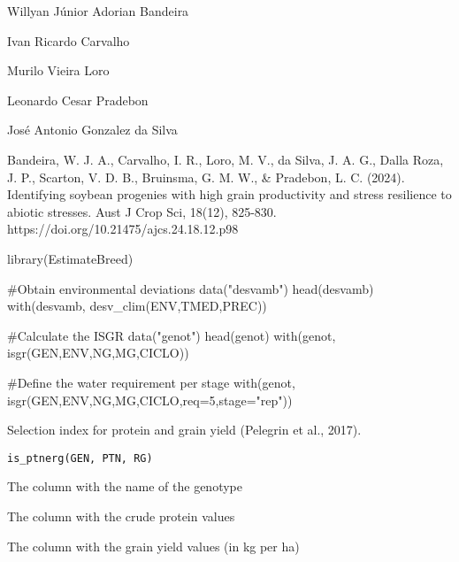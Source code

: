 \documentclass[a4paper]{book}
\begin{document}
%
\begin{Author}
Willyan Júnior Adorian Bandeira

Ivan Ricardo Carvalho

Murilo Vieira Loro

Leonardo Cesar Pradebon

José Antonio Gonzalez da Silva
\end{Author}
%
\begin{References}
Bandeira, W. J. A., Carvalho, I. R., Loro, M. V., da Silva, J. A. G.,
Dalla Roza, J. P., Scarton, V. D. B., Bruinsma, G. M. W., \& Pradebon, L. C. (2024).
Identifying soybean progenies with high grain productivity and stress resilience
to abiotic stresses. Aust J Crop Sci, 18(12), 825-830.
https://doi.org/10.21475/ajcs.24.18.12.p98
\end{References}
%
\begin{Examples}
\begin{ExampleCode}

library(EstimateBreed)

#Obtain environmental deviations
data("desvamb")
head(desvamb)
with(desvamb, desv_clim(ENV,TMED,PREC))

#Calculate the ISGR
data("genot")
head(genot)
with(genot, isgr(GEN,ENV,NG,MG,CICLO))

#Define the water requirement per stage
with(genot, isgr(GEN,ENV,NG,MG,CICLO,req=5,stage="rep"))

\end{ExampleCode}
\end{Examples}
%
\begin{Description}
Selection index for protein and grain yield (Pelegrin et al., 2017).
\end{Description}
%
\begin{Usage}
\begin{verbatim}
is_ptnerg(GEN, PTN, RG)
\end{verbatim}
\end{Usage}
%
\begin{Arguments}
\begin{ldescription}
\item[\code{GEN}] The column with the name of the genotype

\item[\code{PTN}] The column with the crude protein values

\item[\code{RG}] The column with the grain yield values (in kg per ha)
\end{ldescription}
\end{Arguments}
\end{document}
